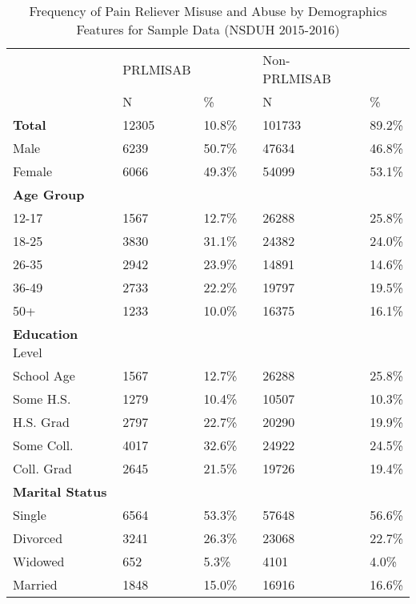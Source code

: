 \documentclass[sigconf]{acmart}
\begin{document}
\begin{table}
  \caption{Frequency of Pain Reliever Misuse and Abuse
  by Demographics Features for Sample Data (NSDUH 2015-2016)}
  \label{tab:freq}
  \begin{tabular}{llllll}
    \toprule
              & PRLMISAB & & & Non-PRLMISAB & \\
              & N & \% &  & N & \% \\
    \midrule
    \textbf{Total}     & 12305 & 10.8\% & & 101733 & 89.2\% \\
    Male      & 6239 & 50.7\% & & 47634 & 46.8\%  \\
    Female    & 6066 & 49.3\% & & 54099 & 53.1\%  \\
    \midrule
    \textbf{Age Group} &  &  &  &  & \\
    12-17     & 1567 & 12.7\% & & 26288 & 25.8\% \\
    18-25     & 3830 & 31.1\% & & 24382 & 24.0\% \\
    26-35     & 2942 & 23.9\% & & 14891 & 14.6\% \\
    36-49     & 2733 & 22.2\% & & 19797 & 19.5\% \\
    50+       & 1233 & 10.0\% & & 16375 & 16.1\% \\
    \midrule
    \textbf{Education} Level &  &  &  &  & \\
    School Age & 1567 & 12.7\% & & 26288 & 25.8\% \\
    Some H.S.  & 1279 & 10.4\% & & 10507 & 10.3\% \\
    H.S. Grad  & 2797 & 22.7\% & & 20290 & 19.9\% \\
    Some Coll. & 4017 & 32.6\% & & 24922 & 24.5\% \\
    Coll. Grad & 2645 & 21.5\% & & 19726 & 19.4\% \\
    \midrule
    \textbf{Marital Status} &  &  &  &  & \\
    Single    & 6564 & 53.3\% & & 57648 & 56.6\% \\
    Divorced  & 3241 & 26.3\% & & 23068 & 22.7\% \\
    Widowed   &  652 &  5.3\% & &  4101 &  4.0\% \\
    Married   & 1848 & 15.0\% & & 16916 & 16.6\% \\
    
    \bottomrule
  \end{tabular}
\end{table}

\end{document}
